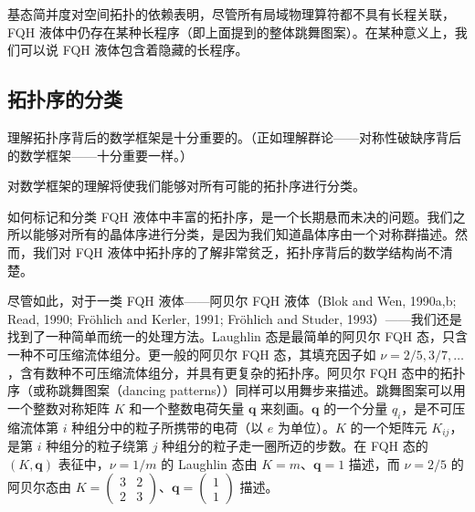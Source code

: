 基态简并度对空间拓扑的依赖表明，尽管所有局域物理算符都不具有长程关联，FQH 液体中仍存在某种长程序（即上面提到的整体跳舞图案）。在某种意义上，我们可以说 FQH 液体包含着隐藏的长程序。


\subsection{拓扑序的分类}

\begin{keypoints}
\item 理解拓扑序背后的数学框架是十分重要的。（正如理解群论——对称性破缺序背后的数学框架——十分重要一样。）
\item 对数学框架的理解将使我们能够对所有可能的拓扑序进行分类。
\end{keypoints}

如何标记和分类 FQH 液体中丰富的拓扑序，是一个长期悬而未决的问题。我们之所以能够对所有的晶体序进行分类，是因为我们知道晶体序由一个对称群描述。然而，我们对 FQH 液体中拓扑序的了解非常贫乏，拓扑序背后的数学结构尚不清楚。

尽管如此，对于一类 FQH 液体——阿贝尔 FQH 液体（Blok and Wen, 1990a,b; Read, 1990; Fröhlich and Kerler, 1991; Fröhlich and Studer, 1993）——我们还是找到了一种简单而统一的处理方法。Laughlin 态是最简单的阿贝尔 FQH 态，只含一种不可压缩流体组分。更一般的阿贝尔 FQH 态，其填充因子如 $\nu=2/5,3/7,\ldots$，含有数种不可压缩流体组分，并具有更复杂的拓扑序。阿贝尔 FQH 态中的拓扑序（或称跳舞图案（dancing patterns））同样可以用舞步来描述。跳舞图案可以用一个整数对称矩阵 $K$ 和一个整数电荷矢量 $\pmb{q}$ 来刻画。$\pmb{q}$ 的一个分量 $q_{i}$，是不可压缩流体第 $i$ 种组分中的粒子所携带的电荷（以 $e$ 为单位）。$K$ 的一个矩阵元 $K_{ij}$，是第 $i$ 种组分的粒子绕第 $j$ 种组分的粒子走一圈所迈的步数。在 FQH 态的 $(K,\pmb{q})$ 表征中，$\nu=1/m$ 的 Laughlin 态由 $K=m$、$\pmb{q}=1$ 描述，而 $\nu=2/5$ 的阿贝尔态由 $K=\begin{pmatrix}3&2\\2&3\end{pmatrix}$、$\pmb{q}=\begin{pmatrix}1\\1\end{pmatrix}$ 描述。

